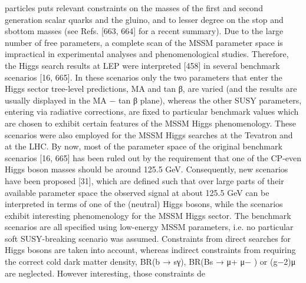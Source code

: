particles puts relevant constraints on the masses of the first and second generation scalar quarks and the
gluino, and to lesser degree on the stop and sbottom masses (see Refs. [663, 664] for a recent summary).
Due to the large number of free parameters, a complete scan of the MSSM parameter space is
impractical in experimental analyses and phenomenological studies. Therefore, the Higgs search results
at LEP were interpreted [458] in several benchmark scenarios [16, 665]. In these scenarios only the two
parameters that enter the Higgs sector tree-level predictions, MA and tan β, are varied (and the results are
usually displayed in the MA − tan β plane), whereas the other SUSY parameters, entering via radiative
corrections, are fixed to particular benchmark values which are chosen to exhibit certain features of the
MSSM Higgs phenomenology. These scenarios were also employed for the MSSM Higgs searches at
the Tevatron and at the LHC.
By now, most of the parameter space of the original benchmark scenarios [16, 665] has been
ruled out by the requirement that one of the CP-even Higgs boson masses should be around 125.5 GeV.
Consequently, new scenarios have been proposed [31], which are defined such that over large parts of
their available parameter space the observed signal at about 125.5 GeV can be interpreted in terms of
one of the (neutral) Higgs bosons, while the scenarios exhibit interesting phenomenology for the MSSM
Higgs sector. The benchmark scenarios are all specified using low-energy MSSM parameters, i.e. no
particular soft SUSY-breaking scenario was assumed. Constraints from direct searches for Higgs bosons
are taken into account, whereas indirect constraints from requiring the correct cold dark matter density,
BR(b → sγ), BR(Bs → μ+ μ− ) or (g−2)μ are neglected. However interesting, those constraints de

